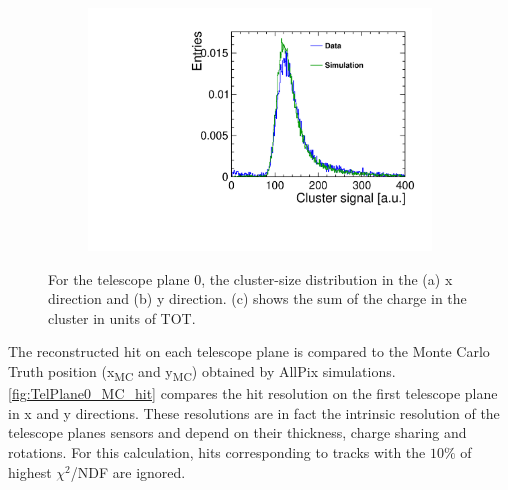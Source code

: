 \begin{figure}[htbp]
\begin{subfigure}[b]{0.3\textwidth}
    \includegraphics[width=\textwidth]{figures/Telescope/biasedResiduals/clusterSignal_telescope0_data_simu.pdf}
    \caption{}
  \end{subfigure}
  \caption{For the telescope plane 0, the cluster-size distribution in the (a) x direction and (b) y direction. (c) shows the sum of the charge in the cluster in units of TOT.} %
  \label{fig:TelescopeCluSize_data_simu}
\end{figure}

The reconstructed hit on each telescope plane is compared to the Monte
Carlo Truth position (x\textsubscript{MC} and y\textsubscript{MC})
obtained by AllPix simulations. \cref{fig:TelPlane0_MC_hit} compares
the hit resolution on the first telescope plane in x and y
directions. These resolutions are in fact the intrinsic resolution of
the telescope planes sensors and depend on their thickness, charge
sharing and rotations. For this calculation, hits corresponding to
tracks with the $10\%$ of highest $\chi^2$/NDF are ignored.


